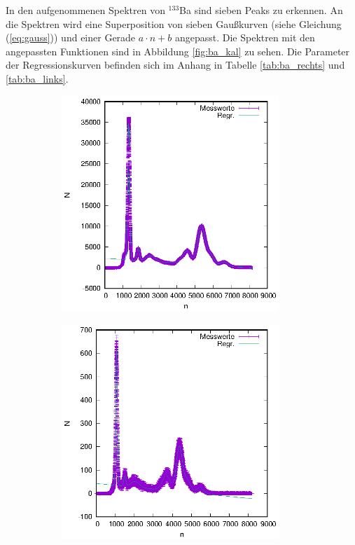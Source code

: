 In den aufgenommenen Spektren von $^{133}$Ba sind sieben Peaks zu erkennen. An die Spektren wird eine Superposition von sieben Gaußkurven (siehe Gleichung (\ref{eq:gauss})) und einer Gerade $a\cdot n+b$ angepasst. Die Spektren mit den angepassten Funktionen sind in Abbildung \ref{fig:ba_kal} zu sehen. Die Parameter der Regressionskurven befinden sich im Anhang in Tabelle \ref{tab:ba_rechts} und \ref{tab:ba_links}. \newpage
\begin{figure}[h]
  \centering
  \begin{subfigure}[h]{0.5\textwidth}
    \centering
    \includegraphics[width=0.9\textwidth]{data/Energiespektren/links_ba_cfd_kal.eps}
    \label{fig:ba_kal_links}
  \end{subfigure}%
  \begin{subfigure}[h]{0.5\textwidth}
    \centering
    \includegraphics[width=0.9\textwidth]{data/Energiespektren/rechts_ba_cfd_kal.eps}

\end{subfigure}
\end{figure}
